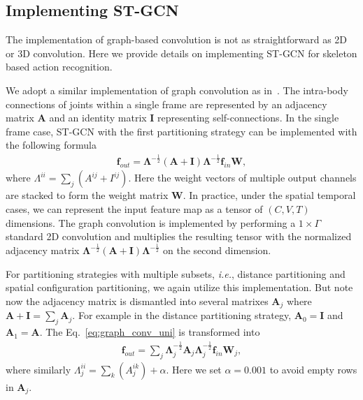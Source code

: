 \documentclass[letterpaper]{article} %
\begin{document}
\subsection{Implementing ST-GCN}
The implementation of graph-based convolution is not as straightforward as 2D or 3D convolution. 
Here we provide details on implementing ST-GCN for skeleton based action recognition.

We adopt a similar implementation of graph convolution as in~\cite{Kipf2017ICLR}.
The intra-body connections of joints within a single frame are represented by an adjacency matrix $ \mathbf{A} $ and an identity matrix $ \mathbf{I} $ representing self-connections.
In the single frame case, ST-GCN with the first partitioning strategy can be implemented with the following formula~\cite{Kipf2017ICLR}
\begin{align}\label{eq:graph_conv_uni}
	\mathbf{f}_{out} = \mathbf{\Lambda}^{-\frac{1}{2}}(\mathbf{A} + \mathbf{I})\mathbf{\Lambda}^{-\frac{1}{2}}\mathbf{f}_{in}\mathbf{W},
\end{align}
where $ \Lambda^{ii} = \sum_j(A^{ij} + I^{ij}) $.
Here the weight vectors of multiple output channels are stacked to form the weight matrix $ \mathbf{W} $.
In practice, under the spatial temporal cases, we can represent the input feature map as a tensor of $(C, V, T)$ dimensions.
The graph convolution is implemented by performing a $ 1\times \Gamma $ standard 2D convolution and multiplies the resulting tensor with the normalized adjacency matrix $ \mathbf{\Lambda}^{-\frac{1}{2}}(\mathbf{A} + \mathbf{I})\mathbf{\Lambda}^{-\frac{1}{2}} $ on the second dimension.

For partitioning strategies with multiple subsets, \emph{i.e.}, distance partitioning and spatial configuration partitioning, we again utilize this implementation. 
But note now the adjacency matrix is dismantled into several matrixes $ \mathbf{A}_j $ where $ \mathbf{A} + \mathbf{I} = \sum_j \mathbf{A}_j $.
For example in the distance partitioning strategy, $ \mathbf{A}_0 = \mathbf{I} $ and $ \mathbf{A}_1 = \mathbf{\mathbf{A}} $. 
The Eq.~\ref{eq:graph_conv_uni} is transformed into
\begin{align}\label{eq:graph_conv_part}
	\mathbf{f}_{out} = \sum_j \mathbf{\Lambda}_j^{-\frac{1}{2}}\mathbf{A}_j\mathbf{\Lambda}_j^{-\frac{1}{2}}\mathbf{f}_{in}\mathbf{W}_j,
\end{align}
where similarly $ \Lambda^{ii}_j = \sum_k(A^{ik}_j) + \alpha$. 
Here we set $ \alpha = 0.001 $ to avoid empty rows in $ \mathbf{A}_j $.
\end{document}

